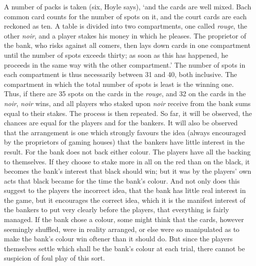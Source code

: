 \documentclass[letterpaper,12pt,oneside,openany]{memoir}
\begin{document}
A number of packs is taken (six, Hoyle says), `and
the cards are well mixed. Bach common card counts
for the number of spots on it, and the court cards are
each reckoned as ten. A table is divided into two compartments,
one called \textit{rouge}, the other \textit{noir}, and a player
stakes his money in which he pleases. The proprietor
of the bank, who risks against all comers, then lays
down cards in one compartment until the number of
spots exceeds thirty; as soon as this has happened, he
proceeds in the same way with the other compartment.'
The number of spots in each compartment is thus
necessarily between 31 and 40, both inclusive. The compartment
in which the total number of spots is least is
the winning one. Thus, if there are 35 spots on the
cards in the \textit{rouge}, and 32 on the cards in the \textit{noir},
\textit{noir} wins, and all players who staked upon \textit{noir} receive
from the bank sums equal to their stakes. The process
is then repeated. So far, it will be observed, the chances
are equal for the players and for the bankers. It will
also be observed that the arrangement is one which
strongly favours the idea (always encouraged by the
proprietors of gaming houses) that the bankers have
little interest in the result. For the bank does not back
either colour. The players have all the backing to
themselves. If they choose to stake more in all on the
red than on the black, it becomes the bank's interest
that black should win; but it was by the players' own
acts that black became for the time the bank's colour.
And not only does this suggest to the players the incorrect
idea, that the bank has little real interest in
the game, but it encourages the correct idea, which it is
the manifest interest of the bankers to put very clearly
before the players, that everything is fairly managed.
If the bank chose a colour, some might think that the
cards, however seemingly shuffled, were in reality arranged,
or else were so manipulated as to make the
bank's colour win oftener than it should do. But since
the players themselves settle which shall be the bank's
colour at each trial, there cannot be suspicion of foul
play of this sort.
\end{document}
